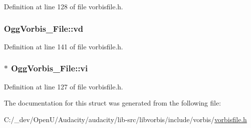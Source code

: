 Definition at line 128 of file vorbisfile.\+h.

\subsubsection[{\texorpdfstring{vd}{vd}}]{ Ogg\+Vorbis\+\_\+\+File\+::vd}\hypertarget{struct_ogg_vorbis___file_acb9d38719f54642d1a39f24203b466d6}{}\label{struct_ogg_vorbis___file_acb9d38719f54642d1a39f24203b466d6}


Definition at line 141 of file vorbisfile.\+h.

\subsubsection[{\texorpdfstring{vi}{vi}}]{$\ast$ Ogg\+Vorbis\+\_\+\+File\+::vi}\hypertarget{struct_ogg_vorbis___file_aa5586b939d7c31c8eec83cf1380b45a6}{}\label{struct_ogg_vorbis___file_aa5586b939d7c31c8eec83cf1380b45a6}


Definition at line 127 of file vorbisfile.\+h.



The documentation for this struct was generated from the following file\+:\begin{DoxyCompactItemize}
\item 
C\+:/\+\_\+dev/\+Open\+U/\+Audacity/audacity/lib-\/src/libvorbis/include/vorbis/\hyperlink{vorbisfile_8h}{vorbisfile.\+h}\end{DoxyCompactItemize}
